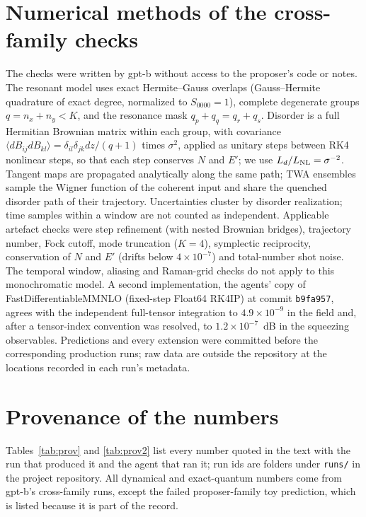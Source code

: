 \documentclass[aps,pra,twocolumn,superscriptaddress,nofootinbib,floatfix]{revtex4-2}
\newcommand{\LNL}{L_{\rm NL}}
\begin{document}
\section{Numerical methods of the cross-family checks}\label{app:methods}

The checks were written by gpt-b without access to the proposer's code or notes. The resonant model uses exact
Hermite--Gauss overlaps (Gauss--Hermite quadrature of exact degree, normalized to $S_{0000}=1$), complete degenerate groups
$q=n_x+n_y<K$, and the resonance mask $q_p+q_q=q_r+q_s$. Disorder is a full Hermitian Brownian matrix within each group, with
covariance $\langle dB_{ij}dB_{kl}\rangle=\delta_{il}\delta_{jk}dz/(q+1)$ times $\sigma^2$, applied as unitary steps between RK4
nonlinear steps, so that each step conserves $N$ and $E'$; we use $L_d/\LNL=\sigma^{-2}$. Tangent maps are propagated
analytically along the same path; TWA ensembles sample the Wigner function of the coherent input and share the quenched
disorder path of their trajectory. Uncertainties cluster by disorder realization; time samples within a window are not
counted as independent. Applicable artefact checks were step refinement (with nested Brownian bridges), trajectory
number, Fock cutoff, mode truncation ($K=4$), symplectic reciprocity, conservation of $N$ and $E'$ (drifts below
$4\times10^{-7}$) and total-number shot noise. The temporal window, aliasing and Raman-grid checks do not apply to this
monochromatic model. A second implementation, the agents' copy of FastDifferentiableMMNLO (fixed-step Float64 RK4IP) at
commit \texttt{b9fa957}, agrees with the independent full-tensor integration to $4.9\times10^{-9}$ in the field and, after a
tensor-index convention was resolved, to $1.2\times10^{-7}$~dB in the squeezing observables. Predictions and every
extension were committed before the corresponding production runs; raw data are outside the repository at the locations
recorded in each run's metadata.

\section{Provenance of the numbers}\label{app:provenance}

Tables~\ref{tab:prov} and \ref{tab:prov2} list every number quoted in the text with the run that produced it and the
agent that ran it; run ids are folders under \texttt{runs/} in the project repository. All dynamical and exact-quantum numbers come from gpt-b's cross-family runs, except the failed
proposer-family toy prediction, which is listed because it is part of the record.



\clearpage

\end{document}
